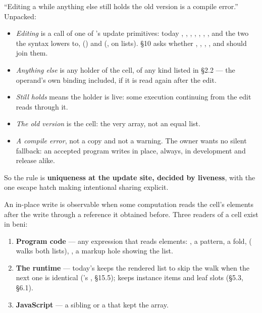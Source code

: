 

“Editing a  while anything else still holds the old version is a compile error.” Unpacked:

\begin{itemize}
\item \emph{Editing} is a call of one of 's update primitives: today , , , , , , , and the two the syntax lowers to,  (\code{[ x, …xs ]}) and  (\code{[ …xs, …ys ]}, \code{++} on lists). §10 asks whether , , , ,  and  should join them.
\item \emph{Anything else} is any holder of the cell, of any kind listed in §2.2 — the operand's own binding included, if it is read again after the edit.
\item \emph{Still holds} means the holder is live: some execution continuing from the edit reads through it.
\item \emph{The old version} is the cell: the very array, not an equal list.
\item \emph{A compile error}, not a copy and not a warning. The owner wants no silent fallback: an accepted program writes in place, always, in development and release alike.
\end{itemize}

So the rule is \textbf{uniqueness at the update site, decided by liveness}, with the one escape hatch  making intentional sharing explicit.


An in-place write is observable when some computation reads the cell's elements after the write through a reference it obtained before. Three readers of a cell exist in beni:

\begin{enumerate}
\item \textbf{Program code} — any expression that reads elements: , a pattern, a fold, \code{==} ( walks both lists), , a markup hole showing the list.
\item \textbf{The runtime} — today's  keeps the rendered list to skip the walk when the next one is identical ('s ,  §15.5);  keeps instance items and leaf slots (§5.3, §6.1).
\item \textbf{JavaScript} — a sibling or a  that kept the array.
\end{enumerate}

